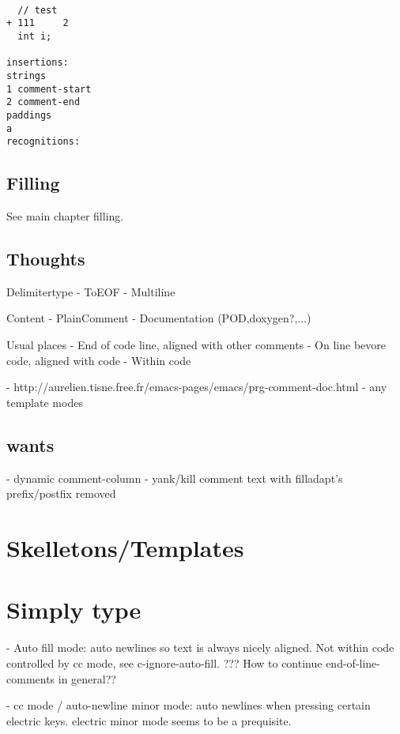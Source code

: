 \documentclass[a4paper]{report}
\begin{document}
\begin{verbatim}

  // test  
+ 111     2                  
  int i;                          

insertions:        
strings        
1 comment-start                
2 comment-end
paddings
a            
recognitions:        
\end{verbatim}

\subsection{Filling}
See main chapter filling.

\subsection{Thoughts}

Delimitertype
  - ToEOF
  - Multiline

Content  
  - PlainComment
  - Documentation (POD,doxygen?,...)
  
Usual places
  - End of code line, aligned with other comments
  - On line bevore code, aligned with code
  - Within code 

- http://aurelien.tisne.free.fr/emacs-pages/emacs/prg-comment-doc.html
- any template modes


\subsection{wants}
- dynamic comment-column
- yank/kill comment text with filladapt's prefix/postfix removed




\section{Skelletons/Templates}

\section{Simply type}

- Auto fill mode: auto newlines so text is always nicely aligned. Not
  within code controlled by cc mode, see c-ignore-auto-fill.
  ??? How to continue end-of-line-comments in general??
  
- cc mode / auto-newline minor mode: auto newlines when pressing certain
  electric keys. electric minor mode seems to be a prequisite.
\end{document}
